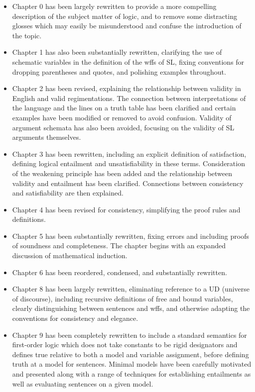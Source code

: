 \begin{itemize}
  \item Chapter 0 has been largely rewritten to provide a more compelling description of the subject matter of logic, and to remove some distracting glosses which may easily be misunderstood and confuse the introduction of the topic.
  \item Chapter 1 has also been substantially rewritten, clarifying the use of schematic variables in the definition of the wffs of SL, fixing conventions for dropping parentheses and quotes, and polishing examples throughout.
  \item Chapter 2 has been revised, explaining the relationship between validity in English and valid regimentations. The connection between interpretations of the language and the lines on a truth table has been clarified and certain examples have been modified or removed to avoid confusion. Validity of argument schemata has also been avoided, focusing on the validity of SL arguments themselves.
  \item Chapter 3 has been rewritten, including an explicit definition of satisfaction, defining logical entailment and unsatisfiability in these terms. Consideration of the weakening principle has been added and the relationship between validity and entailment has been clarified. Connections between consistency and satisfiability are then explained.
  \item Chapter 4 has been revised for consistency, simplifying the proof rules and definitions.
  \item Chapter 5 has been substantially rewritten, fixing errors and including proofs of soundness and completeness. The chapter begins with an expanded discussion of mathematical induction.
  \item Chapter 6 has been reordered, condensed, and substantially rewritten.
  \item Chapter 8 has been largely rewritten, eliminating reference to a UD (universe of discourse), including recursive definitions of free and bound variables, clearly distinguishing between sentences and wffs, and otherwise adapting the conventions for consistency and elegance.
  \item Chapter 9 has been completely rewritten to include a standard semantics for first-order logic which does not take constants to be rigid designators and defines true relative to both a model and variable assignment, before defining truth at a model for sentences. Minimal models have been carefully motivated and presented along with a range of techniques for establishing entailments as well as evaluating sentences on a given model.

\end{itemize}
